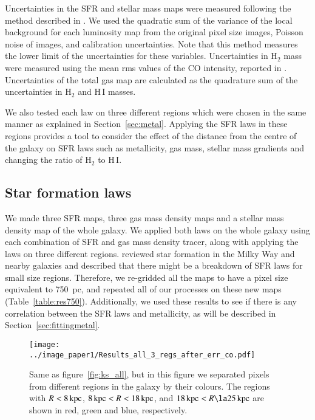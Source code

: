 Uncertainties in the SFR and stellar mass maps  were measured following the method described in \citet{Kennicutt07}. We used the quadratic sum of the variance of the local background for each luminosity map from the original pixel size images, Poisson noise of images, and calibration uncertainties. Note that this method measures the lower limit of the uncertainties for these variables. Uncertainties in H$_2$ mass were measured using the mean rms values of the  CO intensity, reported in \cite{Nieten06}. Uncertainties of the total gas map are calculated as the quadrature sum of the uncertainties in  H$_2$ and H\,{\sc I} masses. 

We also tested each law on three different regions which were chosen in the same manner as explained in Section~\ref{sec:metal}. Applying the SFR laws in these regions provides a tool to consider the effect of the distance from the centre of the galaxy on SFR laws such as metallicity, gas mass, stellar mass gradients and changing the ratio of H$_2$ to H\,{\sc I}. 


\subsection{Star formation laws}
\label{sec: sfl}

We made three SFR maps, three gas mass density maps and a stellar mass density map of the whole galaxy. We applied both laws on the whole galaxy using each combination of SFR and gas mass density tracer, along with applying the laws on three different regions. \citet{Kennicutt12} reviewed star formation in the Milky Way and nearby galaxies and described that there might be a breakdown of SFR laws for small size regions. Therefore, we re-gridded all the maps to have a pixel size equivalent to 750~pc, and repeated all of our processes on these new maps (Table~\ref{table:res750}). Additionally, we used these results to see if there is any correlation between the SFR laws and metallicity, as will be described in Section~\ref{sec:fittingmetal}.
 
\begin{figure*}

\texttt{[image: ../image\_paper1/Results\_all\_3\_regs\_after\_err\_co.pdf]}
\caption{Same as figure~\ref{fig:ks_all}, but in this figure we separated pixels from different regions in the galaxy by their colours. The regions with $R< 8\,{\rm kpc}$, $8\,{\rm kpc} < R < 18\,{\rm kpc}$, and $18\kpc < R \la 25\kpc$ are shown in red, green and blue, respectively.}%
\label{fig:ks,regs}
\end{figure*}


